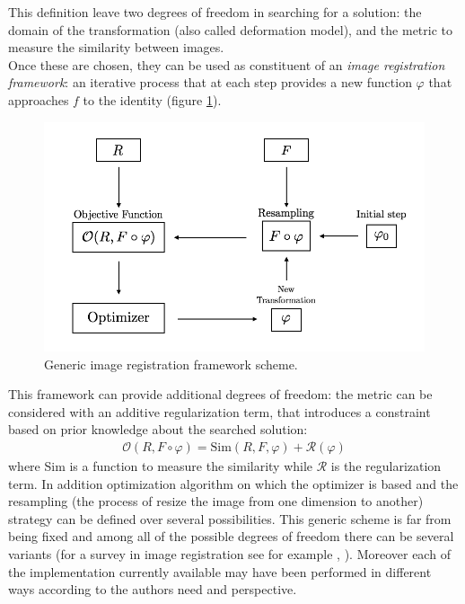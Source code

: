 \noindent
This definition leave two degrees of freedom in searching for a solution: the domain of the transformation (also called deformation model), and the metric to measure the similarity between images. \\
Once these are chosen, they can be used as constituent of an \emph{image registration framework}: an iterative process that at each step provides a new function $\varphi$ that approaches $f$ to the identity (figure \ref{fig:iterative_algorithm_scheme}).
\begin{figure}[!ht]
	\centering
	\includegraphics[scale=0.35]{figures/iterative_algorithm.png}
	\caption{Generic image registration framework scheme.}
	\label{fig:iterative_algorithm_scheme}
\end{figure}
This framework can provide additional degrees of freedom: the metric can be considered with an additive regularization term, that introduces a constraint based on prior knowledge about the searched solution:
\begin{align*}
\mathcal{O}(R,F\circ\varphi) = \text{Sim}(R,F,\varphi) + \mathcal{R}(\varphi) 
\end{align*}
where Sim is a function to measure the similarity while $\mathcal{R}$ is the regularization term.
In addition optimization algorithm on which the optimizer is based and the resampling (the process of resize the image from one dimension to another) strategy can be defined over several possibilities.
This generic scheme is far from being fixed and among all of the possible degrees of freedom there can be several variants (for a survey in image registration see for example \cite{Sotiras:survey:13}, \cite{Hill:survey:01}). Moreover each of the implementation currently available may have been performed in different ways according to the authors need and perspective.\\

